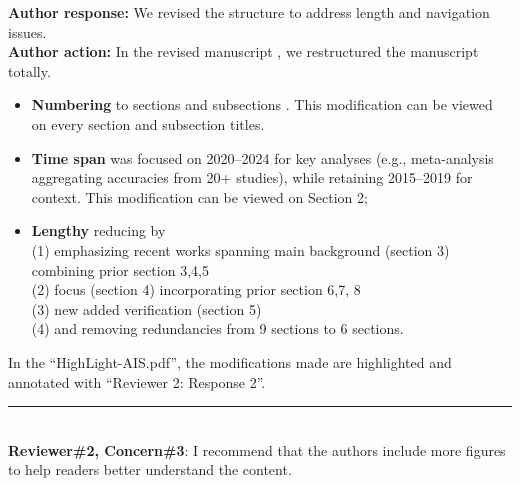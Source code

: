 \documentclass[Afour,sageh,times]{sagej}
\begin{document}
\textbf{Author response:} We revised the structure to address length and navigation issues.\\
\textbf{Author action:} In the revised manuscript , we restructured the manuscript totally. \\
\begin{itemize}  
\item \textbf{ Numbering } to sections and subsections . This modification can be viewed on every section and subsection titles. \\
\item \textbf{Time span} was focused on 2020–2024 for key analyses (e.g., meta-analysis aggregating accuracies from 20+ studies), while retaining 2015–2019 for context. This modification can be viewed on Section 2; \\
\item  \textbf{Lengthy } reducing by \\
(1) emphasizing recent works spanning main background (section 3) combining prior section 3,4,5\\
(2) focus (section 4) incorporating prior section 6,7, 8 \\
(3) new added verification (section 5) \\
(4) and removing redundancies from 9 sections to 6 sections. \\
\end{itemize}

\textcolor{myOrange}{
In the “HighLight-AIS.pdf”, the modifications made are highlighted and annotated with “Reviewer 2: Response 2”. } \\

\color{gray}\rule{\linewidth}{1pt}\normalcolor\\

\textcolor{myGreen}{ \textbf{Reviewer\#2, Concern\#3}: I recommend that the authors include more figures to help readers better understand the content.}  \\
\end{document}
